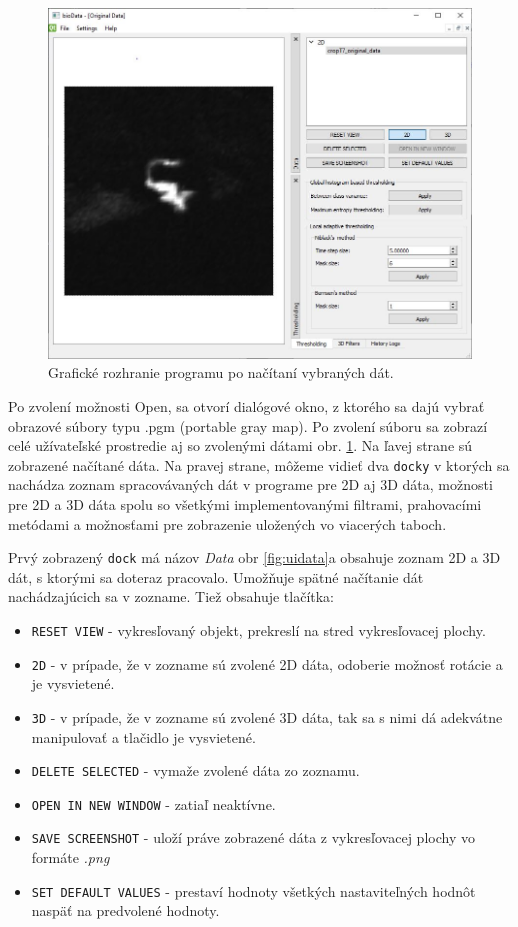 \documentclass[a4paper,11pt,twoside]{article}%
\begin{document}
\begin{figure}[h!]
 \begin{center} 
 \includegraphics[scale=0.50]{pics/ui1.jpg}
\caption{Grafické rozhranie programu po načítaní vybraných dát.}
\end{center} 
\label{fig:ui1}
\end{figure}

Po zvolení možnosti Open, sa otvorí dialógové okno, z ktorého sa dajú vybrať obrazové súbory typu .pgm (portable gray map). Po zvolení súboru sa zobrazí celé užívateľské prostredie aj so zvolenými dátami obr. \ref{fig:ui1}. Na ľavej strane sú zobrazené načítané dáta. Na pravej strane, môžeme vidieť dva \texttt{docky} v ktorých sa nachádza zoznam spracovávaných dát v programe pre 2D aj 3D dáta, možnosti pre 2D a 3D dáta spolu so všetkými implementovanými filtrami, prahovacími metódami a možnosťami pre zobrazenie uložených vo viacerých taboch. 

Prvý zobrazený \texttt{dock} má názov \textit{Data} obr \ref{fig:uidata}a obsahuje zoznam 2D a 3D dát, s ktorými sa doteraz pracovalo. Umožňuje spätné načítanie dát nachádzajúcich sa v zozname. Tiež obsahuje tlačítka: 
\begin{itemize}
\item \texttt{RESET VIEW} - vykresľovaný objekt, prekreslí na stred vykresľovacej plochy.  
\item \texttt{2D} - v prípade, že v zozname sú zvolené 2D dáta, odoberie možnosť rotácie a je vysvietené.
\item \texttt{3D} - v prípade, že v zozname sú zvolené 3D dáta, tak sa s nimi dá adekvátne manipulovať a tlačidlo je vysvietené.
\item \texttt{DELETE SELECTED} - vymaže zvolené dáta zo zoznamu.
\item \texttt{OPEN IN NEW WINDOW} - zatiaľ neaktívne.
\item \texttt{SAVE SCREENSHOT} - uloží práve zobrazené dáta z vykresľovacej plochy vo formáte \textit{.png}
\item \texttt{SET DEFAULT VALUES} - prestaví hodnoty všetkých nastaviteľných hodnôt naspäť na predvolené hodnoty.
\end{itemize}
\end{document}
